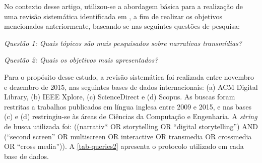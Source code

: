 \documentclass[
article,			%
11pt,				%
oneside,			%
a4paper,			%
english,			%
brazil,				%
sumario=tradicional
]{abntex2}
\begin{document}
  No contexto desse artigo, utilizou-se a abordagem básica para a realização de uma revisão sistemática identificada em , a fim de realizar os objetivos mencionados anteriormente, baseando-se nas seguintes questões de pesquisa:

  \emph{Questão 1: Quais tópicos são mais pesquisados sobre narrativas transmídias?}

  \emph{Questão 2: Quais os objetivos mais apresentados?}


  Para o propósito desse estudo, a revisão sistemática foi realizada entre novembro e dezembro de 2015, nas seguintes bases de dados internacionais: (a) ACM Digital Library, (b) IEEE Xplore, (c) ScienceDirect e (d) Scopus. As buscas foram restritas a trabalhos publicados em língua inglesa entre 2009 e 2015, e nas bases (c) e (d) restringiu-se às áreas de Ciências da Computação e Engenharia.  A \textit{string} de busca utilizada foi: \textsf{((narrativ* OR storytelling OR ``digital storytelling'') AND (``second screen'' OR multiscreen OR interactive OR transmedia OR crossmedia OR ``cross media''))}. A \autoref{tab-queries2} apresenta o protocolo utilizado em cada base de dados.
\end{document}
